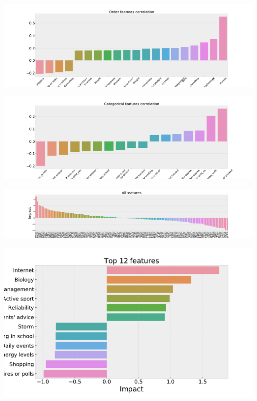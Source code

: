 \documentclass[russian, 10pt]{beamer}
\begin{document}
\begin{frame}

\centering
\includegraphics[scale=0.15]{images/14.pdf}

\end{frame}

\begin{frame}

\centering
\includegraphics[scale=0.15]{images/15.pdf}

\end{frame}

\begin{frame}

\centering
\includegraphics[scale=0.15]{images/16.pdf}

\end{frame}

\begin{frame}

\centering
\includegraphics[scale=0.45]{images/17.pdf}

\end{frame}
\end{document}
